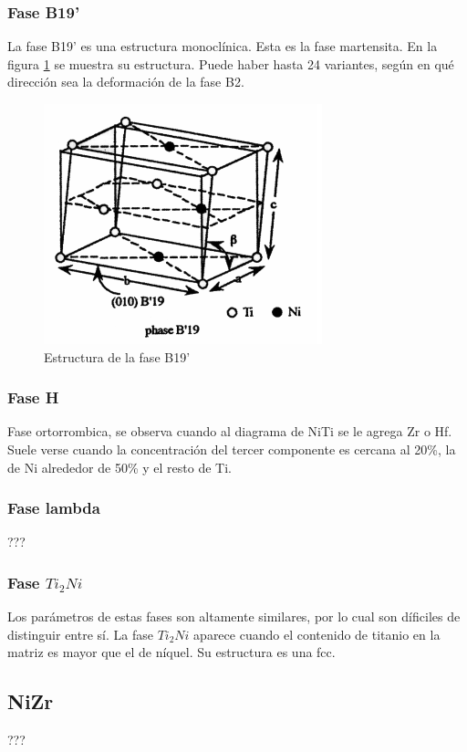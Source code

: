 \documentclass{article}
\theoremstyle{definition}
\theoremstyle{remark}
\begin{document}
\subsubsection{Fase B19'}
La fase B19' es una estructura monoclínica. Esta es la fase martensita. En la figura \ref{B19pPhase} se muestra su estructura. Puede haber hasta 24 variantes, según en qué dirección sea la deformación de la fase B2.
\begin{figure}[H]
	\centering
	\includegraphics[scale=0.4]{img/B19pPhase.png}
	\caption{Estructura de la fase B19'}
	\label{B19pPhase}
\end{figure}

\subsubsection{Fase H}
Fase ortorrombica, se observa cuando al diagrama de NiTi se le agrega Zr o Hf. Suele verse cuando la concentración del tercer componente es cercana al 20\%, la de Ni alrededor de 50\% y el resto de Ti. 

\subsubsection{Fase lambda}
???

\subsubsection{Fase $Ti_2Ni$}

Los parámetros de estas fases son altamente similares, por lo cual son díficiles de distinguir entre sí. La fase $Ti_2Ni$ aparece cuando el contenido de titanio en la matriz es mayor que el de níquel. Su estructura es una fcc.

\subsection{NiZr}
???
\end{document}
